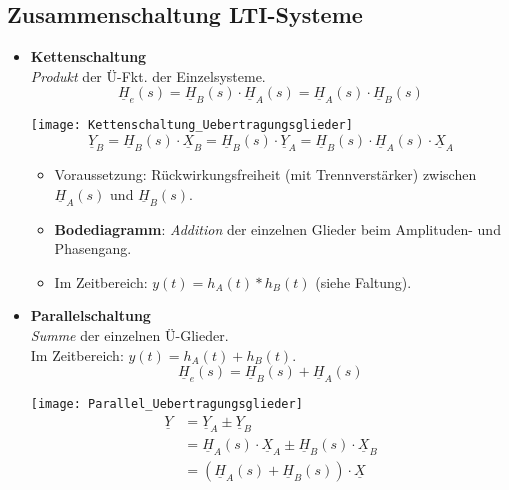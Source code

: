 \clearpage
\subsection{Zusammenschaltung LTI-Systeme}
\begin{itemize}
    \item \textbf{Kettenschaltung}\\
        \textit{Produkt} der Ü-Fkt. der Einzelsysteme.
        \[
            \boxed{\underline{H}_{e}(s)=\underline{H}_{B}(s) \cdot \underline{H}_{A}(s)=\underline{H}_{A}(s) \cdot \underline{H}_{B}(s)}
        \]
        \begin{center}
            \texttt{[image: Kettenschaltung\_Uebertragungsglieder]}
            \[
                \underline{Y}_{B}=\underline{H}_{B}(s) \cdot \underline{X}_{B}=\underline{H}_{B}(s) \cdot \underline{Y}_{A}=\underline{H}_{B}(s) \cdot \underline{H}_{A}(s) \cdot \underline{X}_{A}
            \]
        \end{center}
        \begin{itemize}
	        \item Voraussetzung: Rückwirkungsfreiheit (mit Trennverstärker) zwischen $\underline{H}_A(s)$ und $\underline{H}_B(s)$.
        	\item \textbf{Bodediagramm}: \textit{Addition} der einzelnen Glieder beim Amplituden- und Phasengang.
        	\item Im Zeitbereich: $y(t)=h_A(t) * h_B(t)$ (siehe Faltung).
        \end{itemize}      
    \item \textbf{Parallelschaltung}\\
        \textit{Summe} der einzelnen Ü-Glieder.\\
        Im Zeitbereich: $y(t)=h_A(t) + h_B(t)$.
        \[
            \boxed{\underline{H}_{e}(s)=\underline{H}_{B}(s) + \underline{H}_{A}(s)}
        \]
        \begin{center}
            \texttt{[image: Parallel\_Uebertragungsglieder]}
            \begin{align*}
                \underline{Y}&=\underline{Y}_{A} \pm \underline{Y}_{B}\\
                             &=\underline{H}_{A}(s) \cdot \underline{X}_{A} \pm \underline{H}_{B}(s) \cdot \underline{X}_{B}\\
                             &=\left(\underline{H}_{A}(s)+\underline{H}_{B}(s)\right) \cdot \underline{X}
            \end{align*}

\end{center}
\end{itemize}
